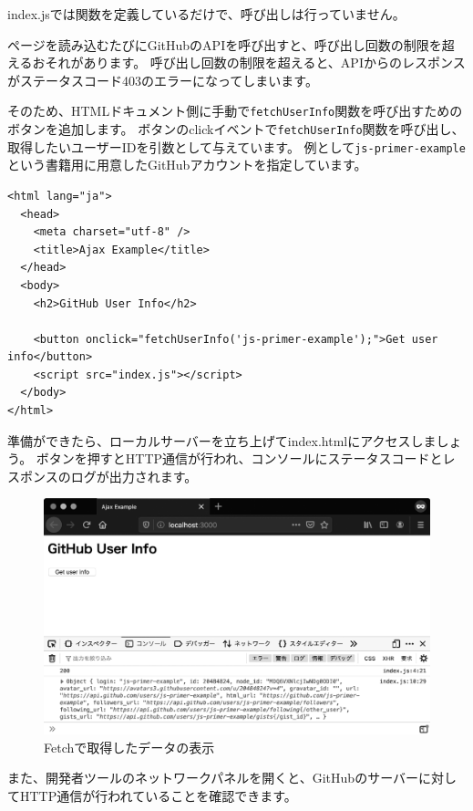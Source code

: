 index.jsでは関数を定義しているだけで、呼び出しは行っていません。

ページを読み込むたびにGitHubのAPIを呼び出すと、呼び出し回数の制限を超えるおそれがあります。
呼び出し回数の制限を超えると、APIからのレスポンスがステータスコード403のエラーになってしまいます。

そのため、HTMLドキュメント側に手動で\texttt{fetchUserInfo}関数を呼び出すためのボタンを追加します。
ボタンのclickイベントで\texttt{fetchUserInfo}関数を呼び出し、取得したいユーザーIDを引数として与えています。
例として\texttt{js-primer-example}という書籍用に用意したGitHubアカウントを指定しています。

\begin{lstlisting}
<html lang="ja">
  <head>
    <meta charset="utf-8" />
    <title>Ajax Example</title>
  </head>
  <body>
    <h2>GitHub User Info</h2>

    <button onclick="fetchUserInfo('js-primer-example');">Get user info</button>
    <script src="index.js"></script>
  </body>
</html>
\end{lstlisting}

準備ができたら、ローカルサーバーを立ち上げてindex.htmlにアクセスしましょう。
ボタンを押すとHTTP通信が行われ、コンソールにステータスコードとレスポンスのログが出力されます。

\begin{figure}[h]
\centering
\includegraphics[width=120mm]{fig/fig-2.eps}
\caption{Fetchで取得したデータの表示}
\end{figure}

また、開発者ツールのネットワークパネルを開くと、GitHubのサーバーに対してHTTP通信が行われていることを確認できます。

